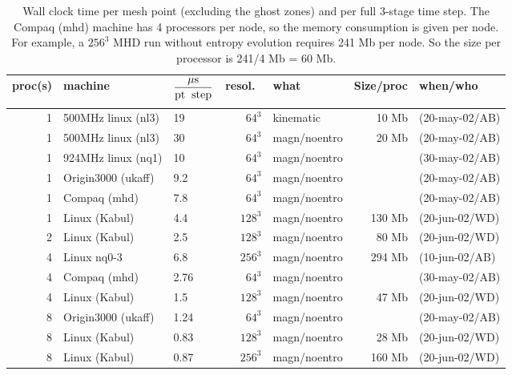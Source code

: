\documentclass[12pt,twoside,notitlepage,a4paper]{article}
\begin{document}
\begin{table}[htb]
  \begin{center}
    \caption{
      Wall clock time per mesh point (excluding the ghost zones)
      and per full 3-stage time step.
      The Compaq (mhd) machine has 4 processors per node, so the memory
      consumption is given per node.
      For example, a $256^3$ MHD run without entropy evolution requires 241 Mb
      per node. So the size per processor is 241/4 Mb = 60 Mb.
      }
    \label{Ttimescale}
    \begin{small}
      \begin{tabular}{rllrlrl}
proc(s)& machine          &  $\displaystyle\frac{{\mu\rm s}}{\rm pt\;\;step}
                             \rule[-2.8ex]{0pt}{5pt}$
                                 & resol.\ & what         & Size/proc
                                                                   & when/who \\
\hline
 1    & 500MHz linux (nl3)&  19  &  $64^3$ & kinematic    &  10 Mb & (20-may-02/AB)\\
 1    & 500MHz linux (nl3)&  30  &  $64^3$ & magn/noentro &  20 Mb & (20-may-02/AB)\\
 1    & 924MHz linux (nq1)&  10  &  $64^3$ & magn/noentro &        & (30-may-02/AB)\\
 1    & Origin3000 (ukaff)& 9.2  &  $64^3$ & magn/noentro &        & (20-may-02/AB)\\
 1    & Compaq (mhd)      & 7.8  &  $64^3$ & magn/noentro &        & (20-may-02/AB)\\
 1    & Linux (Kabul)     & 4.4  & $128^3$ & magn/noentro & 130 Mb & (20-jun-02/WD)\\
 2    & Linux (Kabul)     & 2.5  & $128^3$ & magn/noentro &  80 Mb & (20-jun-02/WD)\\
 4    & Linux nq0-3       & 6.8  & $256^3$ & magn/noentro & 294 Mb & (10-jun-02/AB)\\
 4    & Compaq (mhd)      & 2.76 &  $64^3$ & magn/noentro &        & (30-may-02/AB)\\
 4    & Linux (Kabul)     & 1.5  & $128^3$ & magn/noentro &  47 Mb & (20-jun-02/WD)\\
 8    & Origin3000 (ukaff)& 1.24 &  $64^3$ & magn/noentro &        & (20-may-02/AB)\\
 8    & Linux (Kabul)     & 0.83 & $128^3$ & magn/noentro &  28 Mb & (20-jun-02/WD)\\
 8    & Linux (Kabul)     & 0.87 & $256^3$ & magn/noentro & 160 Mb & (20-jun-02/WD)\\

\end{tabular}
\end{small}
\end{center}
\end{table}
\end{document}
